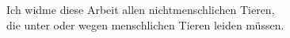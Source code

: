 \cleardoublepage\null

\vspace*{\fill}

\begin{center}

	\it

	Ich widme diese Arbeit allen nichtmenschlichen Tieren,\\
	die unter oder wegen menschlichen Tieren leiden müssen.

\end{center}

\vspace*{\fill}
